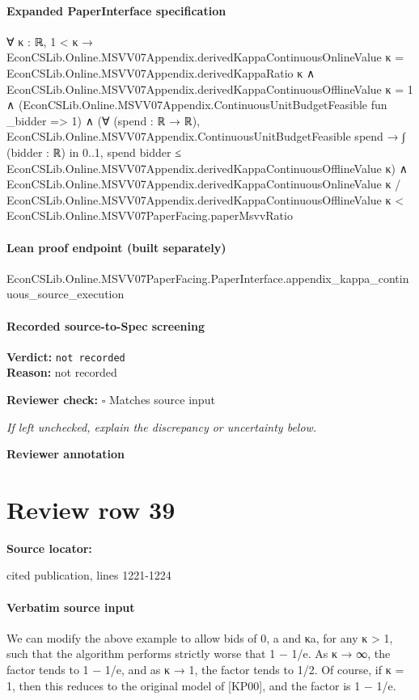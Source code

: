 \documentclass[10pt]{article}
\newcommand{\reviewerbox}{%
  \par\noindent\fbox{\parbox{0.96\linewidth}{\rule{0pt}{0.38in}}}\par
}
\newcommand{\reviewmatch}[1]{%
  \par\noindent\textbf{Reviewer check:} $\square$\; #1\par
  \noindent\emph{If left unchecked, explain the discrepancy or uncertainty below.}\par
}
\begin{document}
\paragraph{Expanded PaperInterface specification}
\begin{ReviewVerbatim}
∀ {κ : ℝ},
  1 < κ →
    EconCSLib.Online.MSVV07Appendix.derivedKappaContinuousOnlineValue κ =
        EconCSLib.Online.MSVV07Appendix.derivedKappaRatio κ ∧
      EconCSLib.Online.MSVV07Appendix.derivedKappaContinuousOfflineValue κ = 1 ∧
        (EconCSLib.Online.MSVV07Appendix.ContinuousUnitBudgetFeasible fun _bidder => 1) ∧
          (∀ (spend : ℝ → ℝ),
              EconCSLib.Online.MSVV07Appendix.ContinuousUnitBudgetFeasible spend →
                ∫ (bidder : ℝ) in 0..1, spend bidder ≤
                  EconCSLib.Online.MSVV07Appendix.derivedKappaContinuousOfflineValue κ) ∧
            EconCSLib.Online.MSVV07Appendix.derivedKappaContinuousOnlineValue κ /
                EconCSLib.Online.MSVV07Appendix.derivedKappaContinuousOfflineValue κ <
              EconCSLib.Online.MSVV07PaperFacing.paperMsvvRatio
\end{ReviewVerbatim}

\paragraph{Lean proof endpoint (built separately)}\begin{ReviewVerbatim}
EconCSLib.Online.MSVV07PaperFacing.PaperInterface.appendix_kappa_continuous_source_execution
\end{ReviewVerbatim}

\paragraph{Recorded source-to-Spec screening}
\textbf{Verdict:} \texttt{not recorded}
\\
\textbf{Reason:} not recorded
\reviewmatch{Matches source input}
\noindent\textbf{Reviewer annotation}\par
\reviewerbox
\clearpage
\hypertarget{source-claim-3d2d65efc7a4e85d}{}
\section*{Review row 39}
\textbf{Source locator:} {\footnotesize\raggedright cited publication, lines 1221-\allowbreak{}1224\par}
\paragraph{Verbatim source input}
\begin{ReviewVerbatim}
We can modify the above example to allow bids of 0, a and κa, for any κ > 1, such that the
algorithm performs strictly worse that 1 − 1/e.
As κ → ∞, the factor tends to 1 − 1/e, and as κ → 1, the factor tends to 1/2. Of course, if
κ = 1, then this reduces to the original model of [KP00], and the factor is 1 − 1/e.
\end{ReviewVerbatim}
\end{document}
